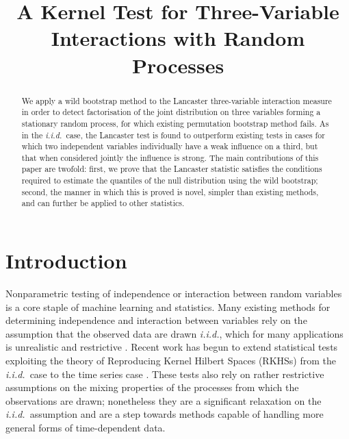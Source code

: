 \documentclass[]{article}
\title{A Kernel Test for Three-Variable Interactions with Random Processes}
\author{} %
\begin{document}
\maketitle

\begin{abstract} 

We apply a wild bootstrap method to the Lancaster three-variable interaction measure in order to detect factorisation of the joint distribution on three variables forming a stationary random process, for which existing permutation bootstrap method fails. As in the \emph{i.i.d.}~case, the Lancaster test is found to outperform existing tests in cases for which two independent variables individually have a weak influence on a third, but that when considered jointly the influence is strong. The main contributions of this paper are twofold: first, we prove that the Lancaster statistic satisfies the conditions required to estimate the quantiles of the null distribution using the wild bootstrap; second, the manner in which this is proved is novel, simpler than existing methods, and can further be applied to other statistics.

\end{abstract} 

\section{Introduction}\label{section:intro}
\label{introduction}
Nonparametric testing of independence or interaction between random variables is a core staple of machine learning and statistics. Many existing methods for determining independence and interaction between variables rely on the assumption that the observed data are drawn \emph{i.i.d.}, which for many applications is unrealistic and restrictive \citep{gretton2005measuring, gretton2007kernel, gretton2005kernel, sejdinovic2013kernel}. Recent work has begun to extend statistical tests exploiting the theory of Reproducing Kernel Hilbert Spaces (RKHSs) from the \emph{i.i.d.}~case to the time series case \citep{chwialkowski2014wild, chwialkowski2014kernel}. These tests also rely on rather restrictive assumptions on the mixing properties of the processes from which the observations are drawn; nonetheless they are a significant relaxation on the \emph{i.i.d.}~assumption and are a step towards methods capable of handling more general forms of time-dependent data. 
\end{document}
